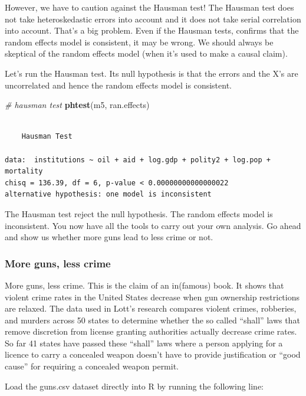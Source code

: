 \documentclass[]{article}
\newenvironment{Shaded}{\begin{snugshade}}{\end{snugshade}}
\newcommand{\KeywordTok}[1]{\textcolor[rgb]{0.13,0.29,0.53}{\textbf{#1}}}
\newcommand{\CommentTok}[1]{\textcolor[rgb]{0.56,0.35,0.01}{\textit{#1}}}
\newcommand{\NormalTok}[1]{#1}
\theoremstyle{definition}
\theoremstyle{definition}
\theoremstyle{definition}
\theoremstyle{remark}
\begin{document}
However, we have to caution against the Hausman test! The Hausman test
does not take heteroskedastic errors into account and it does not take
serial correlation into account. That's a big problem. Even if the
Hausman tests, confirms that the random effects model is consistent, it
may be wrong. We should always be skeptical of the random effects model
(when it's used to make a causal claim).

Let's run the Hausman test. Its null hypothesis is that the errors and
the X's are uncorrelated and hence the random effects model is
consistent.

\begin{Shaded}
\begin{Highlighting}[]
\CommentTok{# hausman test}
\KeywordTok{phtest}\NormalTok{(m5, ran.effects)}
\end{Highlighting}
\end{Shaded}

\begin{verbatim}

    Hausman Test

data:  institutions ~ oil + aid + log.gdp + polity2 + log.pop + mortality
chisq = 136.39, df = 6, p-value < 0.00000000000000022
alternative hypothesis: one model is inconsistent
\end{verbatim}

The Hausman test reject the null hypothesis. The random effects model is
inconsistent. You now have all the tools to carry out your own analysis.
Go ahead and show us whether more guns lead to less crime or not.

\subsubsection{More guns, less crime}\label{more-guns-less-crime}

More guns, less crime. This is the claim of an in(famous) book. It shows
that violent crime rates in the United States decrease when gun
ownership restrictions are relaxed. The data used in Lott's research
compares violent crimes, robberies, and murders across 50 states to
determine whether the so called ``shall'' laws that remove discretion
from license granting authorities actually decrease crime rates. So far
41 states have passed these ``shall'' laws where a person applying for a
licence to carry a concealed weapon doesn't have to provide
justification or ``good cause'' for requiring a concealed weapon permit.

Load the guns.csv dataset directly into R by running the following line:
\end{document}
